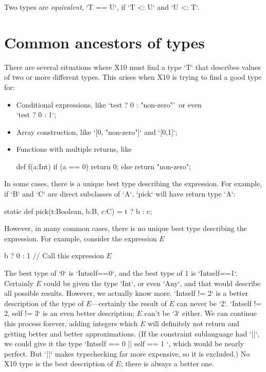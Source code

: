 Two types are {\em equivalent}, \xcd`T == U`, if \xcd`T <: U` and \xcd`U <: T`. 


\section{Common ancestors of types}
\label{LCA}

There are several situations where X10 must find a type \xcd`T` that describes
values of two or more different types.  This arises when X10 is trying to find
a good type for: 
\begin{itemize}
\item Conditional expressions, like \xcd`test ? 0 : "non-zero"` or even \\
      \xcd`test ? 0 : 1`;
\item Array construction, like \xcd`[0, "non-zero"]` and 
      \xcd`[0,1]`;
\item Functions with multiple returns, like
\begin{xten}
def f(a:Int) {
  if (a == 0) return 0;
  else return "non-zero";
}
\end{xten}
\end{itemize}

In some cases, there is a unique best type describing the expression.  For
example, if \xcd`B` and \xcd`C` are direct subclasses of \xcd`A`, \xcd`pick`
will have return type \xcd`A`: 
\begin{xten}
static def pick(t:Boolean, b:B, c:C) = t ? b : c;  
\end{xten}

However, in many common cases, there is no unique best type describing the
expression.  For example, consider the expression {$E$} 
\begin{xtenmath}
b ? 0 : 1   // Call this expression $E$
\end{xtenmath}
The
best type of \xcd`0` 
is \xcd`Int{self==0}`, and the best type of 1 is \xcd`Int{self==1}`.
Certainly {$E$} could be given the type \xcd`Int`, or even \xcd`Any`, and that
would describe all possible results.  However, we actually know more.
\xcd`Int{self != 2}` is a better description of the type of {$E$}---certainly
the result of {$E$} can never be \xcd`2`.   \xcd`Int{self != 2, self != 3}` is
an even better description; {$E$} can't be \xcd`3` either.  We can continue
this process forever, adding integers which {$E$} will definitely not return
and getting better and better approximations. (If the constraint
sublanguage had \xcd`||`, we could give it the type 
\xcd`Int{self == 0 || self == 1} `, which would be nearly perfect.  But 
\xcd`||` makes typechecking far more expensive, so it is excluded.)
No X10 type is the best description of {$E$}; there is always a better one.

